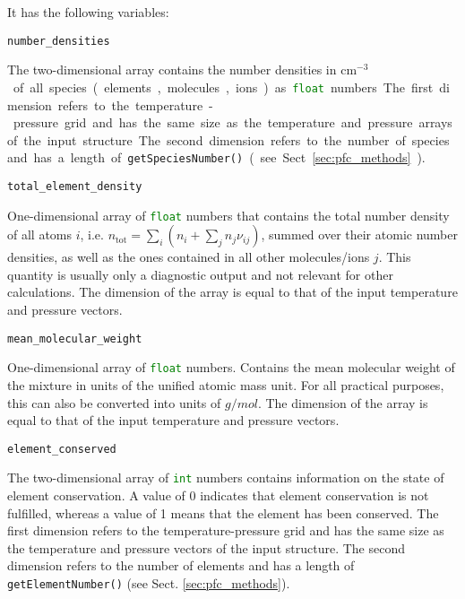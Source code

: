 \documentclass[numbers=noenddot]{fcmanual}
\begin{document}
It has the following variables:

\lstinline!number_densities!
\begin{addmargin}[25pt]{0pt}
	The two-dimensional array contains the number densities in \unit{cm$^{-3}$} of all species (elements, molecules, ions) as \lstinline[language=Python]!float! numbers. The first dimension refers to the temperature-pressure grid and has the same size as the temperature and pressure arrays of the input structure. The second dimension refers to the number of species and has a length of \lstinline!getSpeciesNumber()! (see Sect. \ref{sec:pfc_methods}).
\end{addmargin}

\bigbreak

\lstinline!total_element_density!
\begin{addmargin}[25pt]{0pt}
	One-dimensional array of \lstinline[language=Python]!float! numbers that contains the total number density of all atoms $i$, i.e. $n_\mathrm{tot} = \sum_i \left( n_i + \sum_j n_j \nu_{ij} \right)$, summed over their atomic number densities, as well as the ones contained in all other molecules/ions $j$. This quantity is usually only a diagnostic output and not relevant for other calculations. The dimension of the array is equal to that of the input temperature and pressure vectors.
\end{addmargin}

\bigbreak

\lstinline!mean_molecular_weight!
\begin{addmargin}[25pt]{0pt}
	One-dimensional array of \lstinline[language=Python]!float! numbers. Contains the mean molecular weight of the mixture in units of the unified atomic mass unit. For all practical purposes, this can also be converted into units of $\unit{g/mol}$. The dimension of the array is equal to that of the input temperature and pressure vectors.
\end{addmargin}

\bigbreak

\lstinline!element_conserved!
\begin{addmargin}[25pt]{0pt}
	The two-dimensional array of \lstinline[language=Python]!int! numbers contains information on the state of element conservation. A value of 0 indicates that element conservation is not fulfilled, whereas a value of 1 means that the element has been conserved. The first dimension refers to the temperature-pressure grid and has the same size as the temperature and pressure vectors of the input structure. The second dimension refers to the number of elements and has a length of \lstinline!getElementNumber()! (see Sect. \ref{sec:pfc_methods}).
\end{addmargin}
\end{document}
